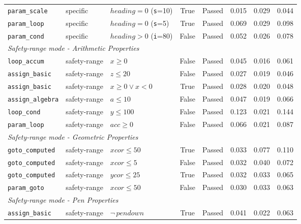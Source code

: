 {\begin{longtable}{p{} p{} p{} c c r r r}
\midrule
\texttt{param\_scale}    & specific & $\mathit{heading}=0$ (\texttt{s}=10) & True  & Passed & 0.015 & 0.029 & 0.044 \\
\texttt{param\_loop}     & specific & $\mathit{heading}=0$ (\texttt{s}=5)  & True  & Passed & 0.069 & 0.029 & 0.098 \\
\texttt{param\_cond}     & specific & $\mathit{heading}>0$ (\texttt{i}=80) & False & Passed & 0.052 & 0.026 & 0.078 \\
\midrule
\multicolumn{8}{l}{\textit{Safety-range mode - Arithmetic Properties}} \\
\midrule
\texttt{loop\_accum}     & safety-range & $x \geq 0$                    & False & Passed & 0.045 & 0.016 & 0.061 \\
\texttt{assign\_basic}   & safety-range & $z \leq 20$                   & False & Passed & 0.027 & 0.019 & 0.046 \\
\texttt{assign\_basic}   & safety-range & $x{\geq}0\vee x{<}0$         & True  & Passed & 0.028 & 0.020 & 0.048 \\
\texttt{assign\_algebra} & safety-range & $a \leq 10$                   & False & Passed & 0.047 & 0.019 & 0.066 \\
\texttt{loop\_cond}      & safety-range & $y \leq 100$                  & False & Passed & 0.123 & 0.021 & 0.144 \\
\texttt{param\_loop}     & safety-range & $\mathit{acc}\geq 0$          & False & Passed & 0.066 & 0.021 & 0.087 \\
\midrule
\multicolumn{8}{l}{\textit{Safety-range mode - Geometric Properties}} \\
\midrule
\texttt{goto\_computed}  & safety-range & $\mathit{xcor}\leq 50$       & True  & Passed & 0.033 & 0.077 & 0.110 \\
\texttt{goto\_computed}  & safety-range & $\mathit{xcor}\leq 5$        & False & Passed & 0.032 & 0.040 & 0.072 \\
\texttt{goto\_computed}  & safety-range & $\mathit{ycor}\leq 25$       & True  & Passed & 0.032 & 0.033 & 0.065 \\
\texttt{param\_goto}     & safety-range & $\mathit{xcor}\leq 50$       & False & Passed & 0.030 & 0.033 & 0.063 \\
\midrule
\multicolumn{8}{l}{\textit{Safety-range mode - Pen Properties}} \\
\midrule
\texttt{assign\_basic}   & safety-range & $\neg\,\mathit{pendown}$     & True  & Passed & 0.041 & 0.022 & 0.063 \\

\end{longtable}}
